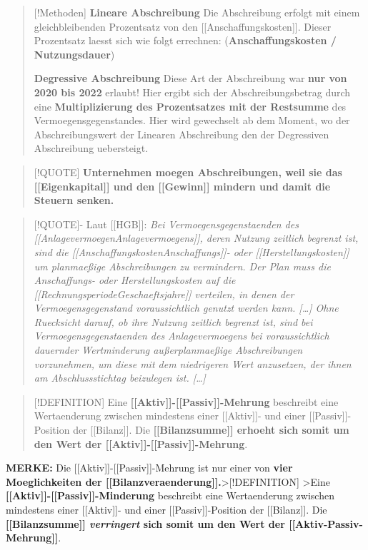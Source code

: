 \begin{quote}
{[}!Methoden{]} \textbf{Lineare Abschreibung} Die Abschreibung erfolgt
mit einem gleichbleibenden Prozentsatz von den
{[}{[}Anschaffungskosten{]}{]}. Dieser Prozentsatz laesst sich wie folgt
errechnen: (\textbf{Anschaffungskosten / Nutzungsdauer})

\textbf{Degressive Abschreibung} Diese Art der Abschreibung war
\textbf{nur von 2020 bis 2022} erlaubt! Hier ergibt sich der
Abschreibungsbetrag durch eine \textbf{Multiplizierung des Prozentsatzes
mit der Restsumme} des Vermoegensgegenstandes. Hier wird gewechselt ab
dem Moment, wo der Abschreibungswert der Linearen Abschreibung den der
Degressiven Abschreibung uebersteigt.
\end{quote}

\begin{quote}
{[}!QUOTE{]} \textbf{Unternehmen moegen Abschreibungen, weil sie das
{[}{[}Eigenkapital{]}{]} und den {[}{[}Gewinn{]}{]} mindern und damit
die Steuern senken.}
\end{quote}

\begin{quote}
{[}!QUOTE{]}- Laut {[}{[}HGB{]}{]}: \emph{Bei Vermoegensgegenstaenden des
{[}{[}Anlagevermoegen\textbar Anlagevermoegens{]}{]}, deren Nutzung
zeitlich begrenzt ist, sind die
{[}{[}Anschaffungskosten\textbar Anschaffungs{]}{]}- oder
{[}{[}Herstellungskosten{]}{]} um planmaeßige Abschreibungen zu
vermindern. Der Plan muss die Anschaffungs- oder Herstellungskosten auf
die {[}{[}Rechnungsperiode\textbar Geschaeftsjahre{]}{]} verteilen, in
denen der Vermoegensgegenstand voraussichtlich genutzt werden kann.
{[}\ldots{]} Ohne Ruecksicht darauf, ob ihre Nutzung zeitlich begrenzt
ist, sind bei Vermoegensgegenstaenden des Anlagevermoegens bei
voraussichtlich dauernder Wertminderung außerplanmaeßige Abschreibungen
vorzunehmen, um diese mit dem niedrigeren Wert anzusetzen, der ihnen am
Abschlussstichtag beizulegen ist. {[}\ldots{]}}
\end{quote}

\begin{quote}
{[}!DEFINITION{]} Eine
\textbf{{[}{[}Aktiv{]}{]}-{[}{[}Passiv{]}{]}-Mehrung} beschreibt eine
Wertaenderung zwischen mindestens einer {[}{[}Aktiv{]}{]}- und einer
{[}{[}Passiv{]}{]}-Position der {[}{[}Bilanz{]}{]}. Die
\textbf{{[}{[}Bilanzsumme{]}{]} erhoeht sich somit um den Wert der
{[}{[}Aktiv{]}{]}-{[}{[}Passiv{]}{]}-Mehrung}.
\end{quote}

\textbf{MERKE:} Die {[}{[}Aktiv{]}{]}-{[}{[}Passiv{]}{]}-Mehrung ist nur
einer von \textbf{vier Moeglichkeiten der
{[}{[}Bilanzveraenderung{]}{]}.}\textgreater{[}!DEFINITION{]}
\textgreater Eine
\textbf{{[}{[}Aktiv{]}{]}-{[}{[}Passiv{]}{]}-Minderung} beschreibt eine
Wertaenderung zwischen mindestens einer {[}{[}Aktiv{]}{]}- und einer
{[}{[}Passiv{]}{]}-Position der {[}{[}Bilanz{]}{]}. Die
\textbf{{[}{[}Bilanzsumme{]}{]} \emph{verringert} sich somit um den Wert
der {[}{[}Aktiv-Passiv-Mehrung{]}{]}}.

